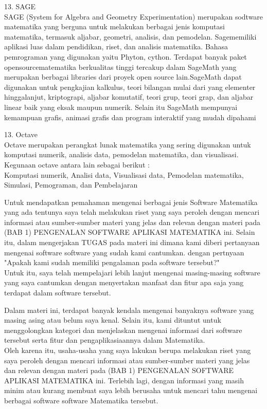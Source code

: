 \documentclass[a4paper,10pt]{article}
\begin{document}
\begin{eulernotebook}
\begin{eulercomment}
13. SAGE\\
SAGE (System for Algebra and Geometry Experimentation) merupakan sodtware
matematika yang berguna untuk melakukan berbagai jenis komputasi matematika,
termasuk aljabar, geometri, analisis, dan pemodelan. Sagememiliki aplikasi
luas dalam pendidikan, riset, dan analisis matematika. Bahasa pemrograman yang
digunakan yaitu Phyton, cython. Terdapat banyak paket opensourcematematika
berkualitas tinggi tercakup dalam SageMath yang merupakan berbagai libraries
dari proyek open source lain.SageMath dapat digunakan untuk pengkajian
kalkulus, teori bilangan mulai dari yang elementer hinggalanjut, kriptograpi,
aljabar komutatif, teori grup, teori grap, dan aljabar linear baik yang eksak
maupun numerik. Selain itu SageMath mempunyai kemampuan grafis, animasi grafis
dan program interaktif yang mudah dipahami

13. Octave\\
Octave merupakan perangkat lunak matematika yang sering digunakan untuk
komputasi numerik, analisis data, pemodelan matematika, dan visualisasi.
Kegunaan octave antara lain sebagai berikut :\\
Komputasi numerik, Analisi data, Visualisasi data, Pemodelan matematika,
Simulasi, Pemograman, dan Pembelajaran

\end{eulercomment}
\begin{eulercomment}
Untuk mendapatkan pemahaman mengenai berbagai jenis Software Matematika yang
ada tentunya saya telah melakukan riset yang saya peroleh dengan mencari
informasi atau sumber-sumber materi yang jelas dan relevan dengan materi pada
(BAB 1) PENGENALAN SOFTWARE APLIKASI MATEMATIKA ini. Selain itu, dalam
mengerjakan TUGAS pada materi ini dimana kami diberi pertanyaan mengenai
software software yang sudah kami cantumkan. dengan pertnyaan "Apakah kami
sudah memiliki pengalaman pada software tersebut?" \\
Untuk itu, saya telah mempelajari lebih lanjut mengenai masing-masing software
yang saya cantumkan dengan menyertakan manfaat dan fitur apa saja yang
terdapat dalam software tersebut.

\end{eulercomment}
\begin{eulercomment}
Dalam materi ini, terdapat banyak kendala mengenai banyaknya software yang
masing asing atau belum saya kenal. Selain itu, kami dituntut untuk
menggolongkan kategori dan menjelaskan mengenai informasi dari software
tersebut serta fitur dan pengaplikasiaannya dalam Matematika.\\
Oleh karena itu, usaha-usaha yang saya lakukan berupa melakukan riset yang
saya peroleh dengan mencari informasi atau sumber-sumber materi yang jelas dan
relevan dengan materi pada (BAB 1) PENGENALAN SOFTWARE APLIKASI MATEMATIKA
ini. Terlebih lagi, dengan informasi yang masih minim atau kurang membuat saya
lebih berusaha untuk mencari tahu mengenai berbagai software software
Matematika tersebut.



\end{eulercomment}
\end{eulernotebook}
\end{document}
